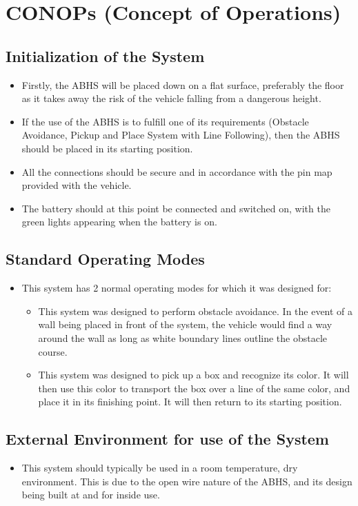 \documentclass{article}
\begin{document}
\section{CONOPs (Concept of Operations)}
\subsection{Initialization of the System}
\begin{itemize}
    \item Firstly, the ABHS will be placed down on a flat surface, preferably the floor as it takes away the risk of the vehicle falling from a dangerous height.
    \item If the use of the ABHS is to fulfill one of its requirements (Obstacle Avoidance, Pickup and Place System with Line Following), then the ABHS should be placed in its starting position.
    \item All the connections should be secure and in accordance with the pin map provided with the vehicle.
    \item The battery should at this point be connected and switched on, with the green lights appearing when the battery is on.
\end{itemize}

\subsection{Standard Operating Modes}
\begin{itemize}
\item This system has 2 normal operating modes for which it was designed for:
    \begin{itemize}
        \item This system was designed to perform obstacle avoidance. In the event of a wall being placed in front of the system, the vehicle would find a way around the wall as long as white boundary lines outline the obstacle course.
        \item This system was designed to pick up a box and recognize its color. It will then use this color to transport the box over a line of the same color, and place it in its finishing point. It will then return to its starting position. 
\end{itemize}
\end{itemize}
\subsection {External Environment for use of the System}
\begin{itemize}
    \item This system should typically be used in a room temperature, dry environment. This is due to the open wire nature of the ABHS, and its design being built at and for inside use.
\end{itemize}
\end{document}
